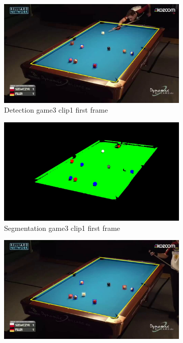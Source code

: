 \begin{figure}[H]
    \centering
    \begin{subfigure}[b]{0.48\textwidth}
        \centering
        \includegraphics[width=\textwidth]{images/Detection/game3_clip1_detected_balls_first_frame.jpg}
        \caption{Detection game3 clip1 first frame}
        \label{fig: game3_clip1_first_frame_detected}
    \end{subfigure}
    \begin{subfigure}[b]{0.48\textwidth}
        \centering
        \includegraphics[width=\textwidth]{images/Segmentation/game3_clip1_segmented_balls_first_frame.jpg}
        \caption{Segmentation game3 clip1 first frame}
		\label{fig: game3_clip1_first_frame_segmented}
    \end{subfigure}
    \begin{subfigure}[b]{0.48\textwidth}
        \centering
        \includegraphics[width=\textwidth]{images/Detection/game3_clip1_detected_balls_last_frame.jpg}

\end{subfigure}
\end{figure}
